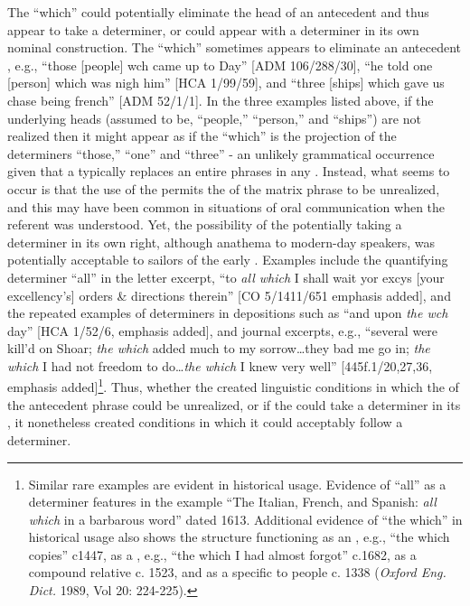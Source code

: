 The  “which” could potentially eliminate the head  of an antecedent  and thus appear to take a determiner, or could appear with a determiner in its own nominal construction. The  “which” sometimes appears to eliminate an antecedent , e.g., “those [people] wch came up to Day” [ADM 106/288/30], “he told one [person] which was nigh him” [HCA 1/99/59], and “three [ships] which gave us chase being french” [ADM 52/1/1]. In the three examples listed above, if the underlying  heads (assumed to be, “people,” “person,” and “ships”) are not realized then it might appear as if the  “which” is the  projection of the determiners “those,” “one” and “three” - an unlikely grammatical occurrence given that a  typically replaces an entire  phrases in any . Instead, what seems to occur is that the use of the  permits the  of the matrix phrase to be unrealized, and this may have been common in situations of oral communication when the referent was understood. Yet, the possibility of the  potentially taking a determiner in its own right, although anathema to modern-day speakers, was potentially acceptable to sailors of the early . Examples include the quantifying determiner “all” in the letter excerpt, “to \textit{all which} I shall wait yor excys [your excellency’s] orders \& directions therein” [CO 5/1411/651 emphasis added], and the repeated examples of  determiners in depositions such as “and upon \textit{the wch} day” [HCA 1/52/6, emphasis added], and journal excerpts, e.g., “several were kill’d on Shoar; \textit{the which} added much to my sorrow…they bad me go in; \textit{the which} I had not freedom to do…\textit{the which} I knew very well” [445f.1/20,27,36, emphasis added]\footnote{Similar rare examples are evident in historical usage. Evidence of “all” as a determiner features in the example “The Italian, French, and Spanish: \textit{all which} in a barbarous word” dated 1613. Additional evidence of “the which” in historical usage also shows the structure functioning as an , e.g., “the which copies” c1447, as a , e.g., “the which I had almost forgot” c.1682, as a compound relative c. 1523, and as a  specific to people c. 1338 (\textit{Oxford Eng. Dict.} 1989, Vol 20: 224-225).}. Thus, whether the  created linguistic conditions in which the  of the antecedent phrase could be unrealized, or if the  could take a determiner in its , it nonetheless created conditions in which it could acceptably follow a determiner. 

